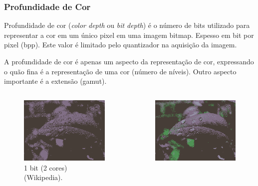 \begin{frame}[allowframebreaks]
  \frametitle{Profundidade de Cor}
  Profundidade de cor (\emph{color depth} ou \emph{bit depth})
  é o número de bits utilizado para representar a cor em um único pixel em uma imagem bitmap.
  Espesso em bit por pixel (bpp). Este valor é limitado pelo quantizador na aquisição da imagem.

  \vspace{0.5cm}
  A profundidade de cor é apenas um aspecto da representação de cor, expressando o quão fina é
  a representação de uma cor (número de níveis). Outro aspecto importante é a extensão (gamut).

  \framebreak

  \begin{columns}[T]
    \begin{figure}[h!]
    \centering
    \includegraphics[width=\textwidth]{images/colordepth-1bit.png}
    \caption{1 bit (2 cores) (Wikipedia).}
    \label{fig:colordepth-1bit}
    \end{figure}
    \begin{figure}[h!]
    \centering
    \includegraphics[width=\textwidth]{images/colordepth-2bit.png}

\end{figure}
\end{columns}
\end{frame}
